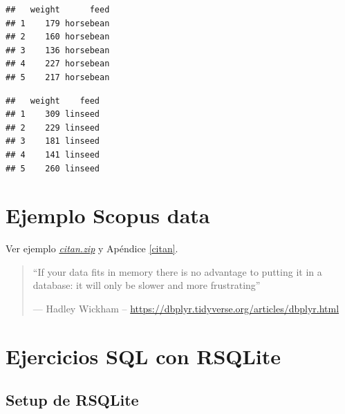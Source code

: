 \documentclass[]{book}
\newenvironment{Shaded}{\begin{snugshade}}{\end{snugshade}}
\newcommand{\KeywordTok}[1]{\textcolor[rgb]{0.13,0.29,0.53}{\textbf{#1}}}
\newcommand{\StringTok}[1]{\textcolor[rgb]{0.31,0.60,0.02}{#1}}
\newcommand{\NormalTok}[1]{#1}
\begin{document}
\begin{Shaded}
\end{Shaded}

\begin{verbatim}
##   weight      feed
## 1    179 horsebean
## 2    160 horsebean
## 3    136 horsebean
## 4    227 horsebean
## 5    217 horsebean
\end{verbatim}

\begin{Shaded}
\end{Shaded}

\begin{verbatim}
##   weight    feed
## 1    309 linseed
## 2    229 linseed
## 3    181 linseed
## 4    141 linseed
## 5    260 linseed
\end{verbatim}

\section{Ejemplo Scopus data}\label{ejemplo-scopus-data}

Ver ejemplo \href{data/citan.zip}{\emph{citan.zip}} y Apéndice
\ref{citan}.

\begin{quote}
``If your data fits in memory there is no advantage to putting it in a
database: it will only be slower and more frustrating''

--- Hadley Wickham --
\url{https://dbplyr.tidyverse.org/articles/dbplyr.html}
\end{quote}

\section{Ejercicios SQL con RSQLite}\label{ejercicios-sql-con-rsqlite}

\subsection{Setup de RSQLite}\label{setup-de-rsqlite}
\end{document}
